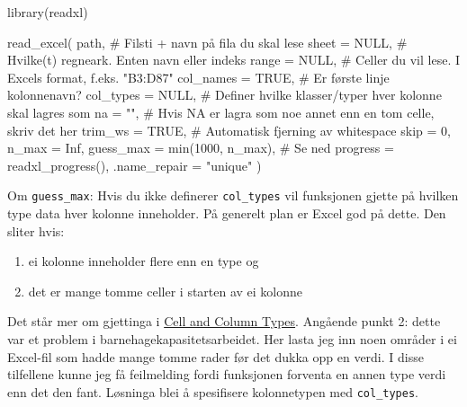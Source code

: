 \documentclass[
  letterpaper,
  DIV=11,
  numbers=noendperiod]{scrreprt}
\newenvironment{Shaded}{\begin{snugshade}}{\end{snugshade}}
\newcommand{\AttributeTok}[1]{\textcolor[rgb]{0.40,0.45,0.13}{#1}}
\newcommand{\CommentTok}[1]{\textcolor[rgb]{0.37,0.37,0.37}{#1}}
\newcommand{\ConstantTok}[1]{\textcolor[rgb]{0.56,0.35,0.01}{#1}}
\newcommand{\DecValTok}[1]{\textcolor[rgb]{0.68,0.00,0.00}{#1}}
\newcommand{\FunctionTok}[1]{\textcolor[rgb]{0.28,0.35,0.67}{#1}}
\newcommand{\NormalTok}[1]{\textcolor[rgb]{0.00,0.23,0.31}{#1}}
\newcommand{\StringTok}[1]{\textcolor[rgb]{0.13,0.47,0.30}{#1}}
\providecommand{\tightlist}{%
  \setlength{\itemsep}{0pt}\setlength{\parskip}{0pt}}\usepackage{longtable,booktabs,array}
\begin{document}
\begin{Shaded}
\begin{Highlighting}[]
\FunctionTok{library}\NormalTok{(readxl)}

\FunctionTok{read\_excel}\NormalTok{(}
\NormalTok{  path, }\CommentTok{\# Filsti + navn på fila du skal lese}
  \AttributeTok{sheet =} \ConstantTok{NULL}\NormalTok{, }\CommentTok{\# Hvilke(t) regneark. Enten navn eller indeks}
  \AttributeTok{range =} \ConstantTok{NULL}\NormalTok{, }\CommentTok{\# Celler du vil lese. I Excels format, f.eks. "B3:D87"}
  \AttributeTok{col\_names =} \ConstantTok{TRUE}\NormalTok{, }\CommentTok{\# Er første linje kolonnenavn?}
  \AttributeTok{col\_types =} \ConstantTok{NULL}\NormalTok{, }\CommentTok{\# Definer hvilke klasser/typer hver kolonne skal lagres som}
  \AttributeTok{na =} \StringTok{""}\NormalTok{, }\CommentTok{\# Hvis NA er lagra som noe annet enn en tom celle, skriv det her}
  \AttributeTok{trim\_ws =} \ConstantTok{TRUE}\NormalTok{, }\CommentTok{\# Automatisk fjerning av whitespace}
  \AttributeTok{skip =} \DecValTok{0}\NormalTok{, }
  \AttributeTok{n\_max =} \ConstantTok{Inf}\NormalTok{,}
  \AttributeTok{guess\_max =} \FunctionTok{min}\NormalTok{(}\DecValTok{1000}\NormalTok{, n\_max), }\CommentTok{\# Se ned}
  \AttributeTok{progress =} \FunctionTok{readxl\_progress}\NormalTok{(),}
  \AttributeTok{.name\_repair =} \StringTok{"unique"} 
\NormalTok{)}
\end{Highlighting}
\end{Shaded}

Om \texttt{guess\_max}: Hvis du ikke definerer \texttt{col\_types} vil
funksjonen gjette på hvilken type data hver kolonne inneholder. På
generelt plan er Excel god på dette. Den sliter hvis:

\begin{enumerate}
\def\labelenumi{\arabic{enumi}.}
\tightlist
\item
  ei kolonne inneholder flere enn en type og
\item
  det er mange tomme celler i starten av ei kolonne
\end{enumerate}

Det står mer om gjettinga i
\href{https://readxl.tidyverse.org/articles/cell-and-column-types.html}{Cell
and Column Types}. Angående punkt 2: dette var et problem i
barnehagekapasitetsarbeidet. Her lasta jeg inn noen områder i ei
Excel-fil som hadde mange tomme rader før det dukka opp en verdi. I
disse tilfellene kunne jeg få feilmelding fordi funksjonen forventa en
annen type verdi enn det den fant. Løsninga blei å spesifisere
kolonnetypen med \texttt{col\_types}.
\end{document}
